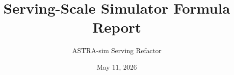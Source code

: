\documentclass[11pt]{article}
\title{Serving-Scale Simulator Formula Report}
\author{ASTRA-sim Serving Refactor}
\date{May 11, 2026}
\begin{document}
\sloppy

\maketitle
\tableofcontents







\end{document}
